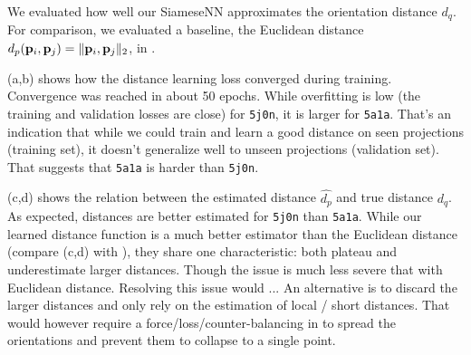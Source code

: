 We evaluated how well our SiameseNN approximates the orientation distance $d_q$.
For comparison, we evaluated a baseline, the Euclidean distance $d_p(\mathbf{p}_i,\mathbf{p}_j) = \|\mathbf{p}_i, \mathbf{p}_j\|_2$, in .

(a,b) shows how the distance learning loss converged during training.
Convergence was reached in about 50 epochs. %
While overfitting is low (the training and validation losses are close) for \texttt{5j0n}, it is larger for \texttt{5a1a}.
That's an indication that while we could train and learn a good distance on seen projections (training set), it doesn't generalize well to unseen projections (validation set).
That suggests that \texttt{5a1a} is harder than \texttt{5j0n}. 

(c,d) shows the relation between the estimated distance $\widehat{d_p}$ and true distance $d_q$.
As expected, distances are better estimated for \texttt{5j0n} than \texttt{5a1a}.
While our learned distance function is a much better estimator than the Euclidean distance (compare (c,d) with ), they share one characteristic: both plateau and underestimate larger distances.
Though the issue is much less severe that with Euclidean distance.
Resolving this issue would ...
An alternative is to discard the larger distances and only rely on the estimation of local / short distances.
That would however require a force/loss/counter-balancing in  to spread the orientations and prevent them to collapse to a single point.

